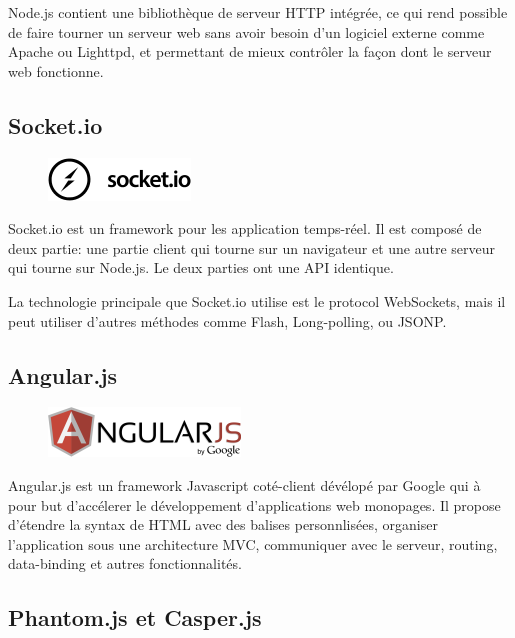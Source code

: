 \documentclass[a4paper]{article}
\begin{document}
Node.js contient une bibliothèque de 
serveur HTTP intégrée, ce qui rend possible de faire tourner un serveur 
web sans avoir besoin d'un logiciel externe comme Apache ou Lighttpd, 
et permettant de mieux contrôler la façon dont le serveur web fonctionne.

\subsection{Socket.io}

\begin{figure}[H]
  \begin{center}
  \includegraphics[scale=1]{socketio.png}
  \end{center}
\end{figure}

Socket.io est un framework pour les application temps-réel. Il est composé de deux 
partie: une partie client qui tourne sur un navigateur et une autre serveur qui tourne sur Node.js.
Le deux parties ont une API identique.

La technologie principale que Socket.io utilise est le protocol WebSockets, mais il
peut utiliser d'autres méthodes comme Flash, Long-polling, ou JSONP.

\subsection{Angular.js}

\begin{figure}[H]
  \begin{center}
  \includegraphics[scale=1]{angularjs.png}
  \end{center}
\end{figure}

Angular.js est un framework Javascript coté-client dévélopé par Google
qui à pour but d'accélerer le développement d'applications web monopages.
Il propose d'étendre la syntax de HTML avec des balises personnlisées, organiser 
l'application sous une architecture MVC, communiquer avec le serveur, routing, 
data-binding et autres fonctionnalités.

\subsection{Phantom.js et Casper.js}
\end{document}
